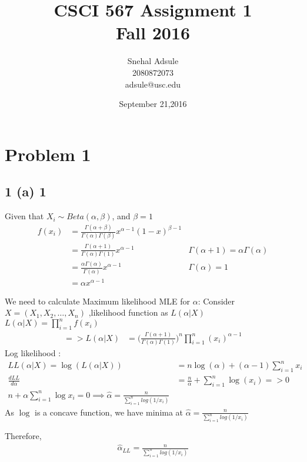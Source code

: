 \documentclass[10pt,letterpaper]{article}
\begin{document}
\title{CSCI 567 Assignment 1 \\Fall 2016}
\date{ September 21,2016}
\author{Snehal Adsule\\2080872073\\adsule@usc.edu}
\maketitle

\newpage
\section{Problem 1}
\subsection{1 (a) 1}
Given that $X_i \sim Beta(\alpha, \beta)$, and $\beta=1$
\begin{align}
 f(x_i)&=\frac{\Gamma(\alpha+\beta)}{\Gamma(\alpha)\Gamma(\beta)}x^{\alpha-1}(1-x)^{\beta-1} \\
 &=\frac{\Gamma(\alpha +1)}{\Gamma(\alpha)\Gamma(1)}x^{\alpha-1} &\Gamma(\alpha+1)=\alpha\Gamma(\alpha)\\
 &=\frac{\alpha \Gamma(\alpha)}{\Gamma(\alpha)} x^{\alpha-1}  &\Gamma(\alpha)=1\\
 &=\alpha x^{\alpha-1}	
\end{align}

We need to calculate Maximum likelihood MLE for $\alpha$:
Consider $X=(X_1,X_2, \dots, X_n)$ ,likelihood function as $L(\alpha|X)$\\
$L(\alpha | X) = \prod_{i=1}^n f(x_i)$\\
\begin{align}
=> L(\alpha|X)&=\big(\frac{\Gamma(\alpha+1)}{\Gamma(\alpha)\Gamma(1)}\big)^n \prod_{i=1}^n (x_i)^{\alpha-1}
\end{align}
Log likelihood :
\begin{align}
LL(\alpha | X)=\log(L(\alpha | X)) &= n \log(\alpha) + (\alpha -1)\sum_{i=1}^n x_i \\
\frac{dLL}{d\alpha} &= \frac{n}{\alpha} + \sum_{i=1}^n{\log(x_i)} => 0 \\
n + \alpha\sum_{i=1}^n \log x_i =0 \implies \hat{\alpha} =  \frac{n}{\sum_{i=1}^n log(1/x_i)}
\end{align}
As  $\log$ is a concave function, we have minima at $\hat{\alpha} =  \frac{n}{\sum_{i=1}^n log(1/x_i)}$ 

Therefore, 
\begin{align}
\hat\alpha_{LL} =  \frac{n}{\sum_{i=1}^n log(1/x_i)}
\end{align}
\end{document}

